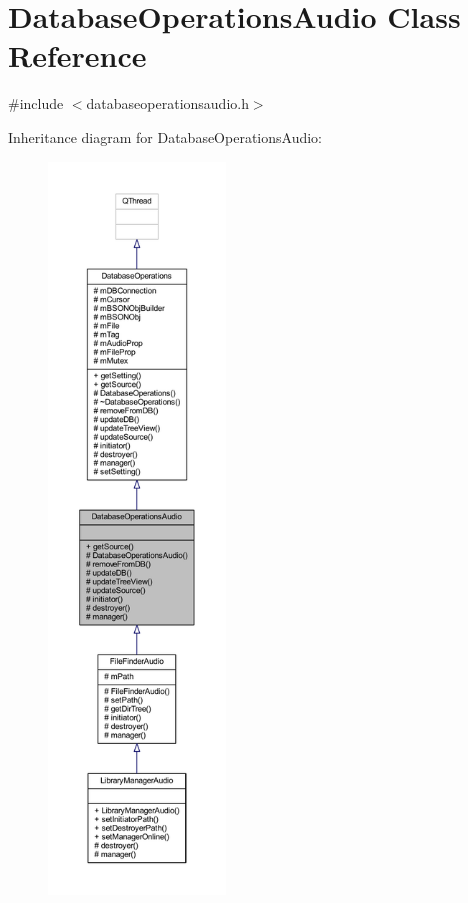 \hypertarget{class_database_operations_audio}{\section{Database\-Operations\-Audio Class Reference}
\label{class_database_operations_audio}
}


{\ttfamily \#include $<$databaseoperationsaudio.\-h$>$}



Inheritance diagram for Database\-Operations\-Audio\-:
\nopagebreak
\begin{figure}[H]
\begin{center}
\leavevmode
\includegraphics[height=550pt]{class_database_operations_audio__inherit__graph}
\end{center}
\end{figure}


